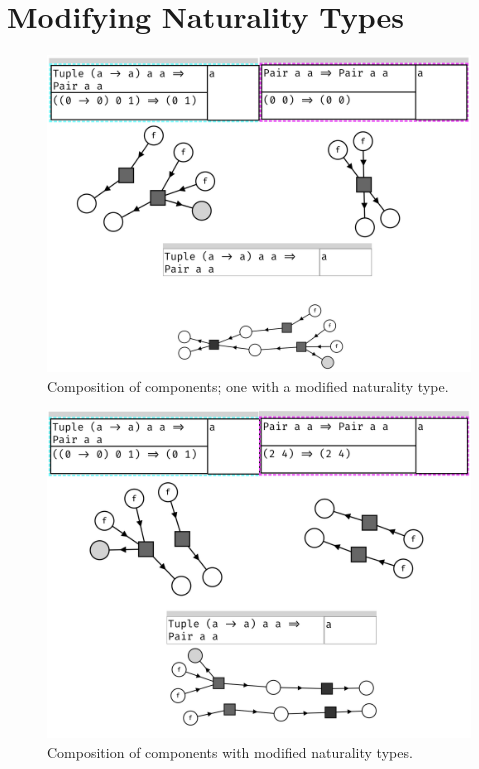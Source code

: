 \documentclass[11pt,openright,hidelinks,a4paper]{article}
\begin{document}
\section{Modifying Naturality Types}\label{app:modcomp}

\begin{figure}[H]
\begin{center}
\includegraphics[scale=0.45]{natcompose2}
\end{center}
\caption{Composition of components; one with a modified naturality type.}
\label{fig:natcompose}
\end{figure}

\begin{figure}[H]
\begin{center}
\includegraphics[scale=0.45]{natcompose}
\end{center}
\caption{Composition of components with modified naturality types.}
\label{fig:natcompose2}
\end{figure}
\end{document}
